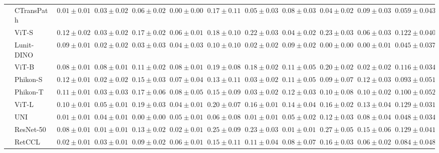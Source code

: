\begin{tabular}{ll|cccc|c|cccc|c}
 & CTransPath~\cite{wang2022transformer} & $0.01 \pm 0.01$ & $0.03 \pm 0.02$ & $0.06 \pm 0.02$ & $\mathbf{0.00 \pm 0.00}$ & $0.17 \pm 0.11$ & $0.05 \pm 0.03$ & $0.08 \pm 0.03$ & $0.04 \pm 0.02$ & $0.09 \pm 0.03$ & $0.059 \pm 0.043$ \\
 & ViT-S~\cite{kolesnikov2021image} & $0.12 \pm 0.02$ & $0.03 \pm 0.02$ & $0.17 \pm 0.02$ & $0.06 \pm 0.01$ & $0.18 \pm 0.10$ & $0.22 \pm 0.03$ & $0.04 \pm 0.02$ & $0.23 \pm 0.03$ & $0.06 \pm 0.03$ & $0.122 \pm 0.040$ \\
 & Lunit-DINO~\cite{kang2023benchmarking} & $0.09 \pm 0.01$ & $0.02 \pm 0.02$ & $0.03 \pm 0.03$ & $0.04 \pm 0.03$ & $0.10 \pm 0.10$ & $0.02 \pm 0.02$ & $0.09 \pm 0.02$ & $\mathbf{0.00 \pm 0.00}$ & $\mathbf{0.00 \pm 0.01}$ & $\mathbf{0.045 \pm 0.037}$ \\
 & ViT-B~\cite{kolesnikov2021image} & $0.08 \pm 0.01$ & $0.08 \pm 0.01$ & $0.11 \pm 0.02$ & $0.08 \pm 0.01$ & $0.19 \pm 0.08$ & $0.18 \pm 0.02$ & $0.11 \pm 0.05$ & $0.20 \pm 0.02$ & $0.02 \pm 0.02$ & $0.116 \pm 0.034$ \\
 & Phikon-S~\cite{filiot2023scaling} & $0.12 \pm 0.01$ & $0.02 \pm 0.02$ & $0.15 \pm 0.03$ & $0.07 \pm 0.04$ & $0.13 \pm 0.11$ & $0.03 \pm 0.02$ & $0.11 \pm 0.05$ & $0.09 \pm 0.07$ & $0.12 \pm 0.03$ & $0.093 \pm 0.051$ \\
 & Phikon-T~\cite{filiot2023scaling} & $0.11 \pm 0.01$ & $0.03 \pm 0.03$ & $0.17 \pm 0.06$ & $0.08 \pm 0.05$ & $0.15 \pm 0.09$ & $0.03 \pm 0.02$ & $0.12 \pm 0.03$ & $0.10 \pm 0.08$ & $0.10 \pm 0.02$ & $0.100 \pm 0.052$ \\
 & ViT-L~\cite{kolesnikov2021image} & $0.10 \pm 0.01$ & $0.05 \pm 0.01$ & $0.19 \pm 0.03$ & $0.04 \pm 0.01$ & $0.20 \pm 0.07$ & $0.16 \pm 0.01$ & $0.14 \pm 0.04$ & $0.16 \pm 0.02$ & $0.13 \pm 0.04$ & $0.129 \pm 0.031$ \\
 & UNI~\cite{chen2024uni} & $\mathbf{0.01 \pm 0.01}$ & $0.04 \pm 0.01$ & $\mathbf{0.00 \pm 0.00}$ & $0.05 \pm 0.01$ & $\mathbf{0.06 \pm 0.08}$ & $\mathbf{0.01 \pm 0.01}$ & $0.05 \pm 0.02$ & $0.12 \pm 0.03$ & $0.08 \pm 0.04$ & $0.048 \pm 0.034$ \\
 & ResNet-50~\cite{he2015deep} & $0.08 \pm 0.01$ & $\mathbf{0.01 \pm 0.01}$ & $0.13 \pm 0.02$ & $0.02 \pm 0.01$ & $0.25 \pm 0.09$ & $0.23 \pm 0.03$ & $\mathbf{0.01 \pm 0.01}$ & $0.27 \pm 0.05$ & $0.15 \pm 0.06$ & $0.129 \pm 0.041$ \\
 & RetCCL~\cite{wang2023retccl} & $0.02 \pm 0.01$ & $0.03 \pm 0.01$ & $0.09 \pm 0.02$ & $0.06 \pm 0.01$ & $0.15 \pm 0.11$ & $0.11 \pm 0.04$ & $0.08 \pm 0.07$ & $0.16 \pm 0.03$ & $0.06 \pm 0.02$ & $0.084 \pm 0.048$ \\

\end{tabular}

